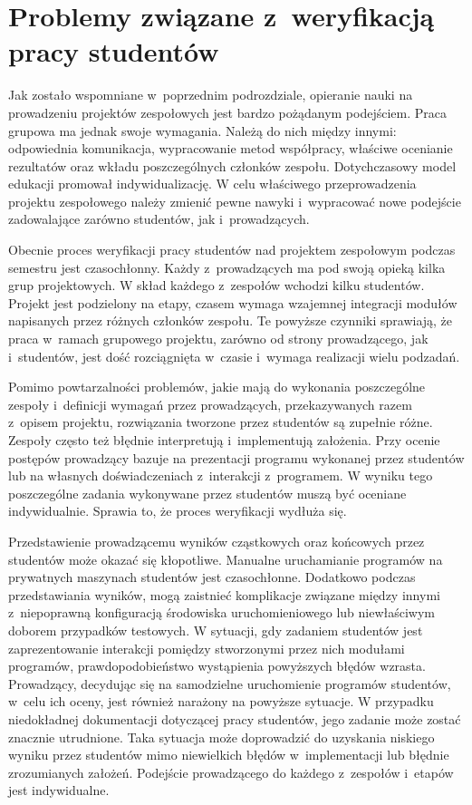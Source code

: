 \section{Problemy związane z~weryfikacją pracy studentów}

Jak zostało wspomniane w~poprzednim podrozdziale, opieranie nauki na prowadzeniu projektów zespołowych jest bardzo pożądanym podejściem.
Praca grupowa ma jednak swoje wymagania.
Należą do nich między innymi: odpowiednia komunikacja, wypracowanie metod współpracy, właściwe ocenianie rezultatów oraz wkładu poszczególnych członków zespołu.
Dotychczasowy model edukacji promował indywidualizację.
W celu właściwego przeprowadzenia projektu zespołowego należy zmienić pewne nawyki i~wypracować nowe podejście zadowalające zarówno studentów, jak i~prowadzących.

Obecnie proces weryfikacji pracy studentów nad projektem zespołowym podczas semestru jest czasochłonny.
Każdy z~prowadzących ma pod swoją opieką kilka grup projektowych.
W skład każdego z~zespołów wchodzi kilku studentów.
Projekt jest podzielony na etapy, czasem wymaga wzajemnej integracji modułów napisanych przez różnych członków zespołu.
Te powyższe czynniki sprawiają, że praca w~ramach grupowego projektu, zarówno od strony prowadzącego, jak i~studentów, jest dość rozciągnięta w~czasie i~wymaga realizacji wielu podzadań.

Pomimo powtarzalności problemów, jakie mają do wykonania poszczególne zespoły i~definicji wymagań przez prowadzących, przekazywanych razem z~opisem projektu, rozwiązania tworzone przez studentów są zupełnie różne.
Zespoły często też błędnie interpretują i~implementują założenia.
Przy ocenie postępów prowadzący bazuje na prezentacji programu wykonanej przez studentów lub na własnych doświadczeniach z~interakcji z~programem.
W wyniku tego poszczególne zadania wykonywane przez studentów muszą być oceniane indywidualnie.
Sprawia to, że proces weryfikacji wydłuża się.

Przedstawienie prowadzącemu wyników cząstkowych oraz końcowych przez studentów może okazać się kłopotliwe.
Manualne uruchamianie programów na prywatnych maszynach studentów jest czasochłonne.
Dodatkowo podczas przedstawiania wyników, mogą zaistnieć komplikacje związane między innymi z~niepoprawną konfiguracją środowiska uruchomieniowego lub niewłaściwym doborem przypadków testowych.
W sytuacji, gdy zadaniem studentów jest zaprezentowanie interakcji pomiędzy stworzonymi przez nich modułami programów, prawdopodobieństwo wystąpienia powyższych błędów wzrasta.
Prowadzący, decydując się na samodzielne uruchomienie programów studentów, w~celu ich oceny, jest również narażony na powyższe sytuacje.
W przypadku niedokładnej dokumentacji dotyczącej pracy studentów, jego zadanie może zostać znacznie utrudnione.
Taka sytuacja może doprowadzić do uzyskania niskiego wyniku przez studentów mimo niewielkich błędów w~implementacji lub błędnie zrozumianych założeń.
Podejście prowadzącego do każdego z~zespołów i~etapów jest indywidualne.

